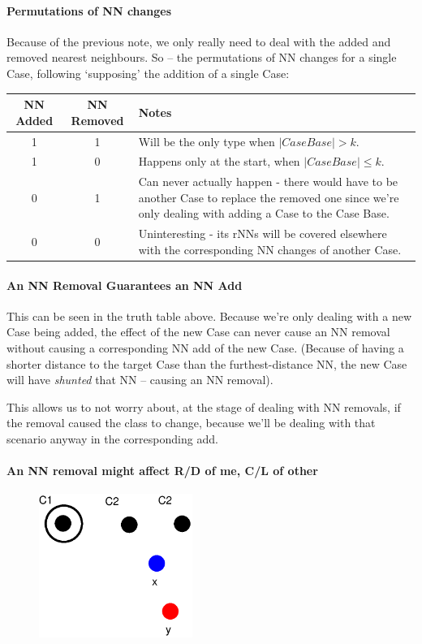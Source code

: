 \documentclass[a4paper,11pt]{report}
\begin{document}
\begin{samepage}
\paragraph{Permutations of NN changes}
Because of the previous note, we only really need to deal with the added and removed nearest neighbours. So – the permutations of NN changes for a single Case, following `supposing' the addition of a single Case:

\begin{tabular}{ | c | c | p{6cm} |} \hline
	NN Added & NN Removed & Notes \\ \hline
	1 & 1 & Will be the only type when $\left|CaseBase\right|> k$. \\ \hline
	1 & 0 & Happens only at the start, when $\left|CaseBase\right|\leq k$. \\ \hline
	0 & 1 & Can never actually happen - there would have to be another Case to replace the removed one since we're only dealing with adding a Case to the Case Base. \\ \hline
	0 & 0 & Uninteresting - its rNNs will be covered elsewhere with the corresponding NN changes of another Case. \\ \hline
\end{tabular}

\end{samepage}

\paragraph{An NN Removal Guarantees an NN Add}
This can be seen in the truth table above. Because we're only dealing with a new Case being added, the effect of the new Case can never cause an NN removal without causing a corresponding NN add of the new Case. (Because of having a shorter distance to the target Case than the furthest-distance NN, the new Case will have \emph{shunted} that NN – causing an NN removal).

This allows us to not worry about, at the stage of dealing with NN removals, if the removal caused the class to change, because we'll be dealing with that scenario anyway in the corresponding add.

\paragraph{An NN removal might affect R/D of me, C/L of other}

\begin{figure}[h!] \centering
\includegraphics[width=5cm]{./Drawn/NnMightAffectEg}
\end{figure}
\end{document}
